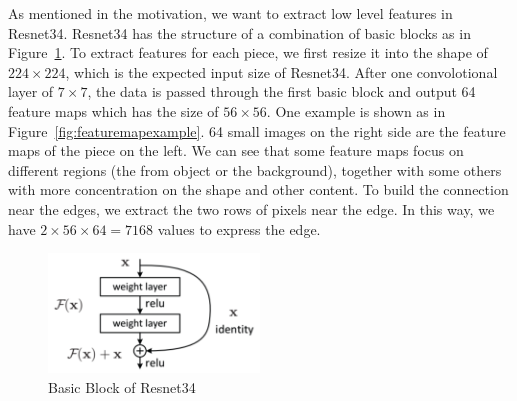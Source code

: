 \documentclass{article}
\begin{document}
As mentioned in the motivation, we want to extract low level features in Resnet34\cite{he2016deep}. Resnet34 has the structure of a combination of basic blocks as in Figure~\ref{fig:basicblock}. To extract features for each piece, we first resize it into the shape of $224\times 224$, which is the expected input size of Resnet34. After one convolotional layer of $7\times7$, the data is passed through the first basic block and output 64 feature maps which has the size of $56\times 56$. One example is shown as in Figure~\ref{fig:featuremapexample}. 64 small images on the right side are the feature maps of the piece on the left. We can see that some feature maps focus on different regions (the from object or the background), together with some others with more concentration on the shape and other content. To build the connection near the edges, we extract the two rows of pixels near the edge. In this way, we have $2\times 56\times 64=7168$ values to express the edge.

\begin{figure}
    \centering
    \includegraphics[width=0.5\textwidth]{basicblock}
    \caption{Basic Block of Resnet34}
    \label{fig:basicblock}
\end{figure}
\end{document}
